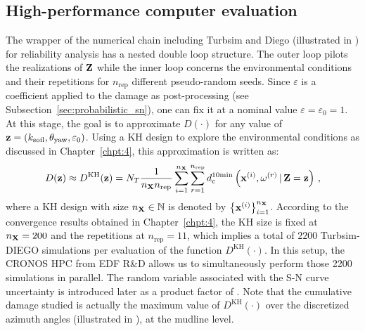 \subsection{High-performance computer evaluation}
The wrapper of the numerical chain including Turbsim and Diego (illustrated in ) for reliability analysis has a nested double loop structure. 
The outer loop pilots the realizations of ${\bf Z}$ while the inner loop concerns the environmental conditions and their repetitions for $n_{\mathrm{rep}}$ different pseudo-random seeds. 
Since $\varepsilon$ is a coefficient applied to the damage as post-processing (see Subsection~\ref{sec:probabilistic_sn}), one can fix it at a nominal value $\varepsilon = \varepsilon_0 =1$. 
At this stage, the goal is to approximate $D(\cdot)$ for any value of ${\bf z} = (k_{\mathrm{soil}}, \theta_{\mathrm{yaw}}, \varepsilon_0)$. 
Using a KH design to explore the environmental conditions as discussed in Chapter~\ref{chpt:4}, this approximation is written as: 
\begin{equation}
    D({\bf z}) \approx D^{\mathrm{KH}}({\bf z}) = N_T \frac{1}{n_{\bf X} n_{\mathrm{rep}}} \sum_{i=1}^{n_{\bf X}} \sum_{r=1}^{n_{\mathrm{rep}}} d_{\mathrm{c}}^{10\mathrm{min}}\left({\bf x}^{(i)}, \omega^{(r)} \,|\, {\bf Z} = {\bf z}\right)\, ,
    \label{eq:hpc_cumulated_damage}
\end{equation}
where a KH design with size $n_{\bf X} \in \mathbb{N}$ is denoted by $\left\{{\bf x}^{(i)}\right\}_{i=1}^{n_{\bf X}}$. 
According to the convergence results obtained in Chapter~\ref{chpt:4}, the KH size is fixed at $n_{\bf X}=200$ and the repetitions at $n_{\mathrm{rep}}=11$, which implies a total of $2200$ Turbsim-DIEGO simulations per evaluation of the function $D^{\mathrm{KH}}(\cdot)$. 
In this setup, the CRONOS HPC from EDF R\&D allows us to simultaneously perform those 2200 simulations in parallel. 
The random variable associated with the S-N curve uncertainty is introduced later as a product factor of . 
Note that the cumulative damage studied is actually the maximum value of $D^{\mathrm{KH}}(\cdot)$ over the discretized azimuth angles (illustrated in ), at the mudline level. 


